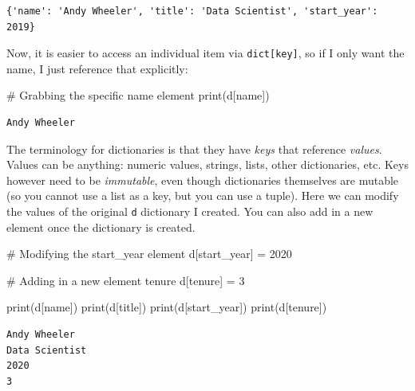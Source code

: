 \documentclass[
  letterpaper,
]{scrbook}
\newenvironment{Shaded}{\begin{snugshade}}{\end{snugshade}}
\newcommand{\BuiltInTok}[1]{\textcolor[rgb]{0.00,0.23,0.31}{#1}}
\newcommand{\CommentTok}[1]{\textcolor[rgb]{0.37,0.37,0.37}{#1}}
\newcommand{\DecValTok}[1]{\textcolor[rgb]{0.68,0.00,0.00}{#1}}
\newcommand{\NormalTok}[1]{\textcolor[rgb]{0.00,0.23,0.31}{#1}}
\newcommand{\OperatorTok}[1]{\textcolor[rgb]{0.37,0.37,0.37}{#1}}
\newcommand{\StringTok}[1]{\textcolor[rgb]{0.13,0.47,0.30}{#1}}
\begin{document}
\begin{verbatim}
{'name': 'Andy Wheeler', 'title': 'Data Scientist', 'start_year':
2019}
\end{verbatim}

Now, it is easier to access an individual item via
\texttt{dict{[}key{]}}, so if I only want the name, I just reference
that explicitly:

\begin{Shaded}
\begin{Highlighting}[]
\CommentTok{\# Grabbing the specific name element}
\BuiltInTok{print}\NormalTok{(d[}\StringTok{\textquotesingle{}name\textquotesingle{}}\NormalTok{])}
\end{Highlighting}
\end{Shaded}

\begin{verbatim}
Andy Wheeler
\end{verbatim}

The terminology for dictionaries is that they have \emph{keys} that
reference \emph{values}. Values can be anything: numeric values,
strings, lists, other dictionaries, etc. Keys however need to be
\emph{immutable}, even though dictionaries themselves are mutable (so
you cannot use a list as a key, but you can use a tuple). Here we can
modify the values of the original \texttt{d} dictionary I created. You
can also add in a new element once the dictionary is created.

\begin{Shaded}
\begin{Highlighting}[]
\CommentTok{\# Modifying the start\_year element}
\NormalTok{d[}\StringTok{\textquotesingle{}start\_year\textquotesingle{}}\NormalTok{] }\OperatorTok{=} \DecValTok{2020}

\CommentTok{\# Adding in a new element tenure}
\NormalTok{d[}\StringTok{\textquotesingle{}tenure\textquotesingle{}}\NormalTok{] }\OperatorTok{=} \DecValTok{3}

\BuiltInTok{print}\NormalTok{(d[}\StringTok{\textquotesingle{}name\textquotesingle{}}\NormalTok{])}
\BuiltInTok{print}\NormalTok{(d[}\StringTok{\textquotesingle{}title\textquotesingle{}}\NormalTok{])}
\BuiltInTok{print}\NormalTok{(d[}\StringTok{\textquotesingle{}start\_year\textquotesingle{}}\NormalTok{])}
\BuiltInTok{print}\NormalTok{(d[}\StringTok{\textquotesingle{}tenure\textquotesingle{}}\NormalTok{])}
\end{Highlighting}
\end{Shaded}

\begin{verbatim}
Andy Wheeler
Data Scientist
2020
3
\end{verbatim}
\end{document}
